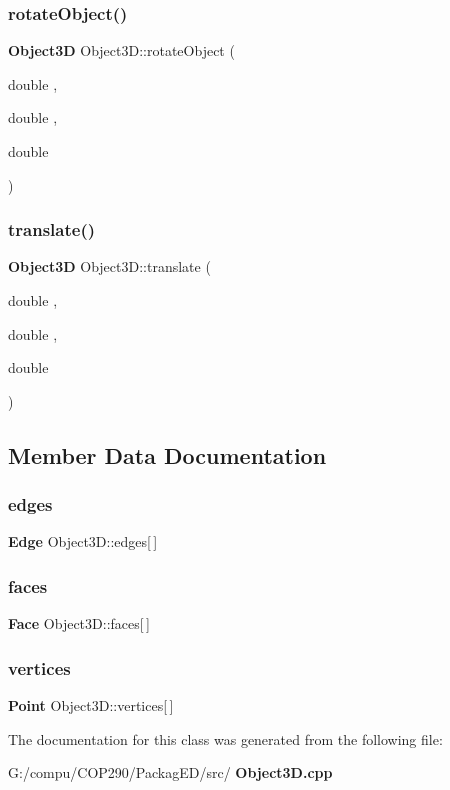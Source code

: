 \subsubsection{rotate\+Object()}
{\footnotesize\ttfamily \textbf{ Object3D} Object3\+D\+::rotate\+Object (\begin{DoxyParamCaption}\item[{double}]{,  }\item[{double}]{,  }\item[{double}]{ }\end{DoxyParamCaption})}

\mbox{\label{class_object3_d_afb299c53794e9f4fb708efbde24c9a21}} 
\subsubsection{translate()}
{\footnotesize\ttfamily \textbf{ Object3D} Object3\+D\+::translate (\begin{DoxyParamCaption}\item[{double}]{,  }\item[{double}]{,  }\item[{double}]{ }\end{DoxyParamCaption})}



\subsection{Member Data Documentation}
\mbox{\label{class_object3_d_ad93f210748663a4d0aaa89287dee3dae}} 
\subsubsection{edges}
{\footnotesize\ttfamily \textbf{ Edge} Object3\+D\+::edges[$\,$]}

\mbox{\label{class_object3_d_a4cc7f57059a990a8573a7644a4d3ab2a}} 
\subsubsection{faces}
{\footnotesize\ttfamily \textbf{ Face} Object3\+D\+::faces[$\,$]}

\mbox{\label{class_object3_d_a23cc82ea4ef0af8e0e22871bdbdba6c6}} 
\subsubsection{vertices}
{\footnotesize\ttfamily \textbf{ Point} Object3\+D\+::vertices[$\,$]}



The documentation for this class was generated from the following file\+:\begin{DoxyCompactItemize}
\item 
G\+:/compu/\+C\+O\+P290/\+Packag\+E\+D/src/\textbf{ Object3\+D.\+cpp}\end{DoxyCompactItemize}
